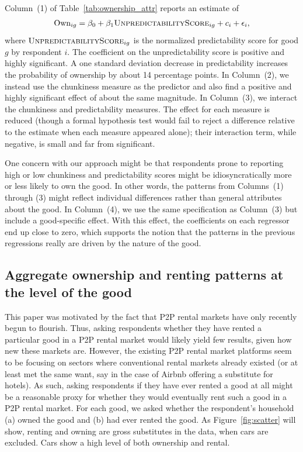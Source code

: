 \documentclass[11pt]{article}
\begin{document}
Column~(1) of Table~\ref{tab:ownership_attr} reports an estimate of 
\begin{align}
  \text{Own}_{ig} = \beta_0 + \beta_1 \textsc{UnpredictabilityScore}_{ig} + c_i + \epsilon_i,
\end{align} 
where $\textsc{UnpredictabilityScore}_{ig}$ is the normalized predictability score for good $g$ by respondent $i$.
The coefficient on the unpredictability score is positive and highly significant.
A one standard deviation decrease in predictability increases the probability of ownership by about 14 percentage points. 
In Column~(2), we instead use the chunkiness measure as the predictor and also find a positive and highly significant effect of about the same magnitude. 
In Column~(3), we interact the chunkiness and predictability measures.
The effect for each measure is reduced (though a formal hypothesis test would fail to reject a difference relative to the estimate when each measure appeared alone); their interaction term, while negative, is small and far from significant.

One concern with our approach might be that respondents prone to reporting high or low chunkiness and predictability scores might be idiosyncratically more or less likely to own the good.
In other words, the patterns from Columns~(1) through (3) might reflect individual differences rather than general attributes about the good.
In Column~(4), we use the same specification as Column~(3) but include a good-specific effect.
With this effect, the coefficients on each regressor end up close to zero, which supports the notion that the patterns in the previous regressions really are driven by the nature of the good. 

\subsection{Aggregate ownership and renting patterns at the level of the good}

This paper was motivated by the fact that P2P rental markets have only recently begun to flourish.
Thus, asking respondents whether they have rented a particular good in a P2P rental market would likely yield few results, given how new these markets are.
However, the existing P2P rental market platforms seem to be focusing on sectors where conventional rental markets already existed (or at least met the same want, say in the case of Airbnb offering a substitute for hotels).
As such, asking respondents if they have ever rented a good at all might be a reasonable proxy for whether they would eventually rent such a good in a P2P rental market. 
For each good, we asked whether the respondent's household (a) owned the good and (b) had ever rented the good.
As Figure~\ref{fig:scatter} will show, renting and owning are gross substitutes in the data, when cars are excluded.
Cars show a high level of both ownership and rental. 
\end{document}
